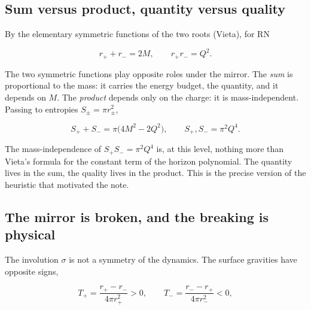 \documentclass[11pt]{article}
\begin{document}
\subsection{Sum versus product, quantity versus quality}

By the elementary symmetric functions of the two roots (Vieta), for RN

\begin{equation*}
r_+ + r_- = 2M, \qquad r_+ r_- = Q^2 .
\tag{3.5}
\end{equation*}

The two symmetric functions play opposite roles under the mirror. The \emph{sum} is proportional to the mass: it carries the energy budget, the quantity, and it depends on $M$. The \emph{product} depends only on the charge: it is mass-independent. Passing to entropies $S_\pm = \pi r_\pm^2$,

\begin{equation*}
S_+ + S_- = \pi\big(4M^2 - 2Q^2\big), \qquad
S_+ , S_- = \pi^2 Q^4 .
\tag{3.6}
\end{equation*}

The mass-independence of $S_+ S_- = \pi^2 Q^4$ is, at this level, nothing more than Vieta's formula for the constant term of the horizon polynomial. The quantity lives in the sum, the quality lives in the product. This is the precise version of the heuristic that motivated the note.

\subsection{The mirror is broken, and the breaking is physical}

The involution $\sigma$ is not a symmetry of the dynamics. The surface gravities have opposite signs,

\begin{equation*}
T_+ = \frac{r_+ - r_-}{4\pi r_+^2} > 0, \qquad
T_- = \frac{r_- - r_+}{4\pi r_-^2} < 0 ,
\tag{3.7}
\end{equation*}
\end{document}
